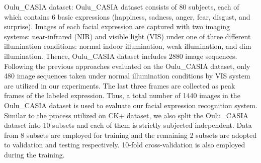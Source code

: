 \documentclass[10pt, conference, compsocconf]{IEEEtran}
\begin{document}
Oulu\_CASIA dataset: Oulu\_CASIA dataset\cite{Zhao2011Facial} consists of 80 subjects, each of which contains 6 basic expressions  (happiness, sadness, anger, fear, disgust, and surprise). Images of each facial expression are captured with two imaging systems: near-infrared (NIR) and visible light (VIS) under one of three different illumination conditions: normal indoor illumination, weak illumination, and dim illumination. Thence, Oulu\_CASIA dataset includes 2880 image sequences. Following the previous approaches evaluated on the Oulu\_CASIA dataset, only 480 image sequences taken under normal illumination conditions by VIS system are utilized in our experiments. The last three frames are collected as peak frames of the labeled expression. Thus, a total number of 1440 images in the Oulu\_CASIA dataset is used to evaluate our facial expression recognition system. Similar to the process utilized on CK+ dataset, we also split the Oulu\_CASIA dataset into 10 subsets and each of them is strictly subjected independent. Data from 8 subsets are employed for training and the remaining 2 subsets are adopted to validation and testing respectively. 10-fold cross-validation is also employed during the training.
\end{document}

